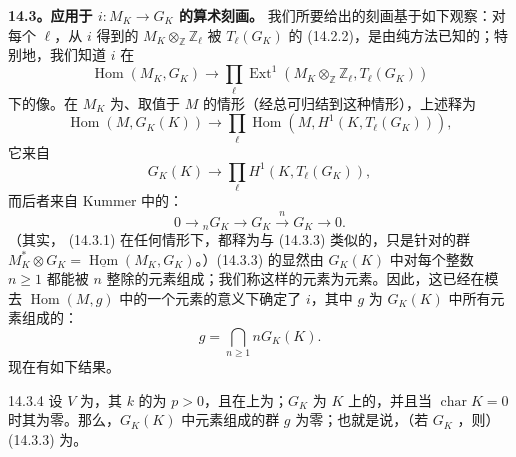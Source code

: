 \textbf{14.3。应用于 $i:M_K\to G_K$ 的算术刻画。}
我们所要给出的刻画基于如下观察：对每个 $\ell$，从 $i$ 得到的 $M_K\otimes_{\mathbb Z}\mathbb Z_\ell$ 被 $T_\ell(G_K)$ 的 (14.2.2)，是由纯方法已知的；特别地，我们知道 $i$ 在
\begin{equation}\tag{14.3.1}
\operatorname{Hom}(M_K,G_K)\longrightarrow
\prod_\ell\operatorname{Ext}^1(M_K\otimes_{\mathbb Z}\mathbb Z_\ell,T_\ell(G_K))
\end{equation}
下的像。在 $M_K$ 为、取值于 $M$ 的情形（经总可归结到这种情形），上述释为
\begin{equation}\tag{14.3.2}
\operatorname{Hom}(M,G_K(K))\longrightarrow
\prod_\ell\operatorname{Hom}(M,H^1(K,T_\ell(G_K))),
\end{equation}
它来自
\begin{equation}\tag{14.3.3}
G_K(K)\longrightarrow\prod_\ell H^1(K,T_\ell(G_K)),
\end{equation}
而后者来自 Kummer 中的：
\[
0\longrightarrow{}_nG_K\longrightarrow G_K\xrightarrow n G_K\longrightarrow0.
\]
（其实， (14.3.1) 在任何情形下，都释为与 (14.3.3) 类似的，只是针对的群 $M_K^*\otimes G_K=\underline{\operatorname{Hom}}(M_K,G_K)$。）(14.3.3) 的显然由 $G_K(K)$ 中对每个整数 $n\geq1$ 都能被 $n$ 整除的元素组成；我们称这样的元素为元素。因此，这已经在模去 $\operatorname{Hom}(M,g)$ 中的一个元素的意义下确定了 $i$，其中 $g$ 为 $G_K(K)$ 中所有元素组成的：
\[
g=\bigcap_{n\geq1}nG_K(K).
\]
现在有如下结果。
\begin{SGAresult}{}{14.3.4}
设 $V$ 为，其 $k$ 的为 $p>0$，且在上为；$G_K$ 为 $K$ 上的，并且当 $\operatorname{char}K=0$ 时其为零。那么，$G_K(K)$ 中元素组成的群 $g$ 为零；也就是说，（若 $G_K$ ，则） (14.3.3) 为。
\end{SGAresult}
